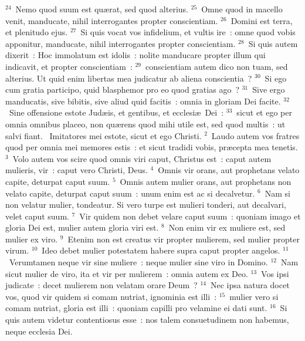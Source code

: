 ${}^{24}$~Nemo quod suum est qu\ae rat, sed quod alterius.
${}^{25}$~Omne quod in macello venit, manducate, nihil interrogantes propter conscientiam.
${}^{26}$~Domini est terra, et plenitudo ejus.
${}^{27}$~Si quis vocat vos infidelium, et vultis ire~: omne quod vobis apponitur, manducate, nihil interrogantes propter conscientiam.
${}^{28}$~Si quis autem dixerit~: Hoc immolatum est idolis~: nolite manducare propter illum qui indicavit, et propter conscientiam~:
${}^{29}$~conscientiam autem dico non tuam, sed alterius. Ut quid enim libertas mea judicatur ab aliena conscientia~?
${}^{30}$~Si ego cum gratia participo, quid blasphemor pro eo quod gratias ago~?
${}^{31}$~Sive ergo manducatis, sive bibitis, sive aliud quid facitis~: omnia in gloriam Dei facite.
${}^{32}$~Sine offensione estote Jud\ae is, et gentibus, et ecclesi\ae\ Dei~:
${}^{33}$~sicut et ego per omnia omnibus placeo, non qu\ae rens quod mihi utile est, sed quod multis~: ut salvi fiant.
~Imitatores mei estote, sicut et ego Christi.
${}^{2}$~Laudo autem vos fratres quod per omnia mei memores estis~: et sicut tradidi vobis, pr\ae cepta mea tenetis.
${}^{3}$~Volo autem vos scire quod omnis viri caput, Christus est~: caput autem mulieris, vir~: caput vero Christi, Deus.
${}^{4}$~Omnis vir orans, aut prophetans velato capite, deturpat caput suum.
${}^{5}$~Omnis autem mulier orans, aut prophetans non velato capite, deturpat caput suum~: unum enim est ac si decalvetur.
${}^{6}$~Nam si non velatur mulier, tondeatur. Si vero turpe est mulieri tonderi, aut decalvari, velet caput suum.
${}^{7}$~Vir quidem non debet velare caput suum~: quoniam imago et gloria Dei est, mulier autem gloria viri est.
${}^{8}$~Non enim vir ex muliere est, sed mulier ex viro.
${}^{9}$~Etenim non est creatus vir propter mulierem, sed mulier propter virum.
${}^{10}$~Ideo debet mulier potestatem habere supra caput propter angelos.
${}^{11}$~Verumtamen neque vir sine muliere~: neque mulier sine viro in Domino.
${}^{12}$~Nam sicut mulier de viro, ita et vir per mulierem~: omnia autem ex Deo.
${}^{13}$~Vos ipsi judicate~: decet mulierem non velatam orare Deum~?
${}^{14}$~Nec ipsa natura docet vos, quod vir quidem si comam nutriat, ignominia est illi~:
${}^{15}$~mulier vero si comam nutriat, gloria est illi~: quoniam capilli pro velamine ei dati sunt.
${}^{16}$~Si quis autem videtur contentiosus esse~: nos talem consuetudinem non habemus, neque ecclesia Dei.


